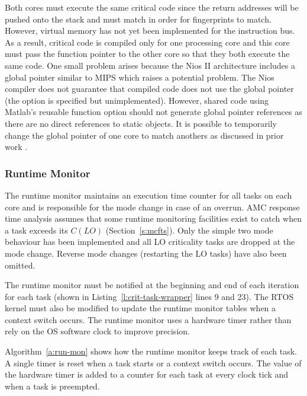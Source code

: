 
	Both cores must execute the same critical code since the return addresses will be pushed onto the stack and must match in order for fingerprints to match. 
	However, virtual memory has not yet been implemented for the instruction bus. 
	As a result, critical code is compiled only for one processing core and this core must pass the function pointer to the other core so that they both execute the same code. 
	One small problem arises because the Nios II architecture includes a global pointer similar to MIPS which raises a potential problem.
	The Nios compiler does not guarantee that compiled code does not use the global pointer (the option is specified but unimplemented). 
	However, shared code using Matlab's reusable function option should not generate global pointer references as there are no direct references to static objects. 
	It is possible to temporarily change the global pointer of one core to match anothers as discussed in prior work \cite{ugthesis}.


\subsubsection{Runtime Monitor}

	The runtime monitor maintains an execution time counter for all tasks on each core and is responsible for the mode change in case of an overrun.
	AMC response time analysis assumes that some runtime monitoring facilities exist to catch when a task exceeds its $C(LO)$ (Section~\ref{s:mcfts}). 
	Only the simple two mode behaviour has been implemented and all LO criticality tasks are dropped at the mode change. 
	Reverse mode changes (restarting the LO tasks) have also been omitted.

	The runtime monitor must be notified at the beginning and end of each iteration for each task (shown in Listing~\ref{l:crit-task-wrapper} lines 9 and 23). 
	The RTOS kernel must also be modified to update the runtime monitor tables when a context switch occurs. 
	The runtime monitor uses a hardware timer rather than rely on the OS software clock to improve precision.
	
	Algorithm~\ref{a:run-mon} shows how the runtime monitor keeps track of each task.
	A single timer is reset when a task starts or a context switch occurs.
	The value of the hardware timer is added to a counter for each task at every clock tick and when a task is preempted.

